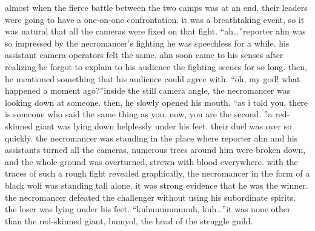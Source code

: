 almost when the fierce battle between the two camps was at an end, their leaders were going to have a one-on-one confrontation.
 it was a breathtaking event, so it was natural that all the cameras were fixed on that fight.
“ah…”reporter ahn was so impressed by the necromancer’s fighting he was speechless for a while.
 his assistant camera operators felt the same.
ahn soon came to his senses after realizing he forgot to explain to his audience the fighting scenes for so long.
 then, he mentioned something that his audience could agree with.
“oh, my god! what happened a moment ago?”inside the still camera angle, the necromancer was looking down at someone.
then, he slowly opened his mouth.
“as i told you, there is someone who said the same thing as you.
 now, you are the second.
”a red-skinned giant was lying down helplessly under his feet.
their duel was over so quickly.
the necromancer was standing in the place where reporter ahn and his assistants turned all the cameras.
 numerous trees around him were broken down, and the whole ground was overturned, strewn with blood everywhere.
with the traces of such a rough fight revealed graphically, the necromancer in the form of a black wolf was standing tall alone.
 it was strong evidence that he was the winner.
the necromancer defeated the challenger without using his subordinate spirits.
 the loser was lying under his feet.
“kuhuuuuuuuuuh, kuh…”it was none other than the red-skinned giant, bumyol, the head of the struggle guild.

